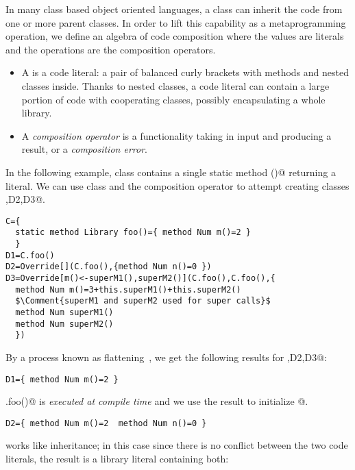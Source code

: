 In many class based object oriented languages, a class can inherit the code
from one or more parent classes.
In order to lift this capability as a metaprogramming operation,
we define an algebra of code composition where the values
are \Q@Library@ literals and the operations are the composition operators.

\begin{itemize}
\item A \Q@Library@ is a code literal:
a pair of balanced curly brackets with methods and nested classes inside.
Thanks to nested classes, a code literal can contain a large portion of code
with cooperating classes, possibly encapsulating a whole library.
\item A \emph{composition operator}
is a functionality taking in input \Q@Library@s and producing a \Q@Library@
result, or a \emph{composition error}.
\end{itemize}

\noindent
In the following example, class \Q@C@ contains a single static 
method \Q@foo()@ returning a \Q@Library@ literal.
We can use class \Q@C@ and the \Q@Override@ composition operator to
attempt creating classes ,D2,D3@.

\begin{lstlisting}
C={
  static method Library foo()={ method Num m()=2 }  
  }
D1=C.foo()
D2=Override[](C.foo(),{method Num n()=0 })
D3=Override[m()<-superM1(),superM2()](C.foo(),C.foo(),{
  method Num m()=3+this.superM1()+this.superM2()
  $\Comment{superM1 and superM2 used for super calls}$
  method Num superM1()
  method Num superM2()
  })
\end{lstlisting}

\noindent
By a process known as flattening~\cite{scharli2003traits}, we get the following results for ,D2,D3@:

\begin{lstlisting}
D1={ method Num m()=2 }  
\end{lstlisting}

\noindent
\Q@C.foo()@ is \emph{executed at compile time}
and we use the result to initialize @.

\begin{lstlisting}
D2={ method Num m()=2  method Num n()=0 }  
\end{lstlisting}

\noindent
\Q@Override@ works like inheritance; in this case since there is no conflict between
the two code literals, the result is a library literal containing both:

